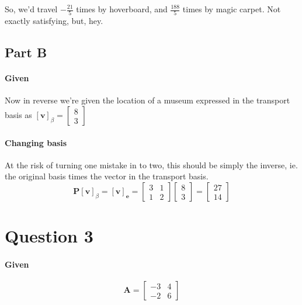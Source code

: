 \documentclass{article}
\begin{document}
                So, we'd travel $-\frac{21}{5}$ times by hoverboard, and $\frac{188}{5}$ times by magic carpet.
                Not exactly satisfying, but, hey.
        \subsection{Part B}
            \paragraph{Given}
                Now in reverse we're given the location of a museum expressed
                in the transport basis as $\left[\mathbf{v}\right]_{\beta}=\begin{bmatrix}8\\3\end{bmatrix}$
            \paragraph{Changing basis}
                At the risk of turning one mistake in to two, this should be simply the inverse, ie. the original basis
                times the vector in the transport basis.
                \[
                    \mathbf{P}\left[\mathbf{v}\right]_{\beta}
                    =
                    \left[\mathbf{v}\right]_{\mathbf{e}}
                    =
                    \begin{bmatrix}
                        3 & 1 \\ 1 & 2
                    \end{bmatrix}
                    \begin{bmatrix}
                        8\\3
                    \end{bmatrix}
                    =
                    \begin{bmatrix}
                        27\\14
                    \end{bmatrix}
                \]
    \section{Question 3}
        \paragraph{Given}
            \[
                \mathbf{A}=
                \begin{bmatrix}-3&4\\-2&6\end{bmatrix}
            \]
\end{document}
